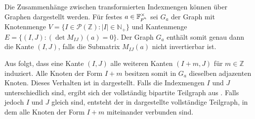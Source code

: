 \begin{sloppypar}
    Die Zusammenhänge zwischen transformierten Indexmengen können über Graphen dargestellt werden. Für festes ${a \in \field{p}[n]^\times}$ sei $G_a$ der Graph mit Knotenmenge ${V=\{I \in\mathcal{P}(\mathbb{Z}) : |I| \in \mathbb{N}_+\}}$ und Kantenmenge $E = \{(I,J) : (\det M_{IJ})(a) = 0\}$. Der Graph $G_a$ enthält somit genau dann die Kante $(I,J)$, falls die Submatrix $M_{IJ}(a)$ nicht invertierbar ist. 
\end{sloppypar}

Aus  folgt, dass eine Kante $(I,J)$ alle weiteren Kanten $(I+m,J)$ für ${m\in \mathbb{Z}}$ induziert. Alle Knoten der Form $I+m$ besitzen somit in $G_a$ dieselben adjazenten Knoten. Dieses Verhalten ist in  dargestellt. Falls die Indexmengen $I$ und $J$ unterschiedlich sind, ergibt sich der vollständig bipartite Teilgraph aus . Falls jedoch $I$ und $J$ gleich sind, entsteht der in  dargestellte vollständige Teilgraph, in dem alle Knoten der Form $I+m$ miteinander verbunden sind. 

